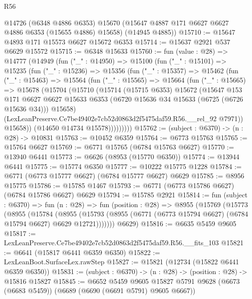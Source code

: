 \begin{lexlean}{R56}
\begin{coremodule}
      @14726
      (@6348 @4886 @6353)
      @15670
      (@15647 @4887 @171 @6627 @6627 @4886 @6353 (@15655 @4886) @15658)
      (@14945 @4885))
@15710 := @15647 @4893 @171 @15573 @6627 @15672 @6353
@15714 := @15637 @2921 @537 @6629 @15572
@15715 := @6348 @15633
@15760 := fun (value : @28) =>
  @14777
    (@14949
      (fun ("_" : @14950) =>
      @15100
        (fun ("_" : @15101) =>
        @15235
          (fun ("_" : @15236) =>
          @15356
            (fun ("_" : @15357) =>
            @15462
              (fun ("_" : @15463) =>
              @15564
                (fun ("_" : @15565) =>
                @15664
                  (fun ("_" : @15665) =>
                  @15678
                    (@15704
                      (@15710
                        (@15714
                          (@15715 @6353)
                          @15672
                          (@15647
                            @153
                            @171
                            @6627
                            @6627
                            @15633
                            @6353
                            (@6720 @15636 @34 @15633 (@6725 (@6726 @15636 @34)))
                            @15658)
                          (LexLeanPreserve.Ce7be49402e7cb52d0863d2f5475daf59.R56.__rel_92 @7971))
                        @15658))
                    (@14650 @14734 @15578)))))))))
@15762 := (subject : @6370) -> (n : @28) -> @10831
@15763 := @10452 @6359
@15764 := @6773 @15763
@15765 := @15764 @6627
@15769 := @6771 @15765 (@6784 @15763 @6627)
@15770 := @13940 @6441
@15773 := @6626 (@8953 (@15770 @6350))
@15774 := @13944 @6441
@15775 := @15774 @6350
@15777 := @10222 @15775 @1228
@15784 := @6771 (@6773 @15777 @6627) (@6784 @15777 @6627) @6629
@15785 := @8956 @15775
@15786 := @15785 @1467
@15793 := @6771 (@6773 @15786 @6627) (@6784 @15786 @6627) @6629
@15794 := @15785 @2921
@15814 := fun (subject : @6370) =>
  fun (n : @28) =>
  fun (position : @28) =>
  @8955
    (@15769
      (@15773
        (@8955
          (@15784
            (@8955
              (@15793 (@8955 (@6771 (@6773 @15794 @6627) (@6784 @15794 @6627) @6629 @12721)))))))
      @6629)
@15816 := @6635 @5459 @9605
@15817 := LexLeanPreserve.Ce7be49402e7cb52d0863d2f5475daf59.R56.__fits_103
@15821 := @6641 (@15817 @6441 @6359 @6350)
@15822 := LexLeanBoot.SurfaceLex.rawStep
@15827 := @15821 (@12734 (@15822 @6441 @6359 @6350))
@15831 := (subject : @6370) -> (n : @28) -> (position : @28) -> @15816 @15827
@15845 := @6652
    @5459
    @9605
    @15827
    @5791
    @9628
    (@6673 (@6683 @5459))
    (@6689 (@6690 (@6691 @5791) @9605 @6667))

\end{coremodule}
\end{lexlean}
